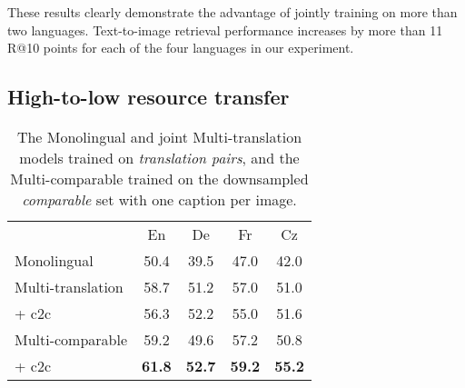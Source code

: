 These results clearly demonstrate the advantage of jointly training on more than two languages. Text-to-image retrieval performance increases by more than 11 R@10 points for each of the four languages in our experiment.

 



\subsection{High-to-low resource transfer}
\label{sec:multitransfer}

\begin{table}[t]
\centering
\renewcommand{\arraystretch}{1.3}
\begin{tabular}{lcccc}
\toprule
& En & De & Fr & Cz \\
\cmidrule{2-5}
Monolingual & 50.4 & 39.5 & 47.0 & 42.0 \\
\midrule
Multi-translation & 58.7 & 51.2 &  57.0 & 51.0\\
+ c2c & 56.3  & 52.2 & 55.0 & 51.6\\
\midrule
Multi-comparable & 59.2 & 49.6 & 57.2 & 50.8 \\
 + c2c & \bf{61.8}  & \bf{52.7} & \bf{59.2} & \bf{55.2} \\
\bottomrule
\end{tabular}
\caption{The Monolingual and joint Multi-translation models trained on \emph{translation pairs}, and the Multi-comparable trained on the downsampled \emph{comparable} set with one caption per image.}
\label{tab:multilingual}
\end{table}

